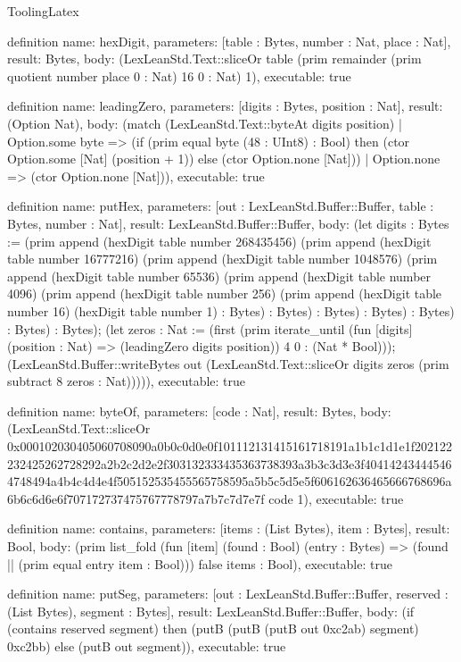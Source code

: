 \begin{lexlean}{ToolingLatex}
\begin{semanticmodule}
definition{
  name: hexDigit,
  parameters: [table : Bytes, number : Nat, place : Nat],
  result: Bytes,
  body: (LexLeanStd.Text::sliceOr table (prim remainder (prim quotient number place 0 : Nat) 16 0 : Nat) 1),
  executable: true
}

definition{
  name: leadingZero,
  parameters: [digits : Bytes, position : Nat],
  result: (Option Nat),
  body: (match (LexLeanStd.Text::byteAt digits position)
    | Option.some byte => (if (prim equal byte (48 : UInt8) : Bool) then (ctor Option.some [Nat] (position + 1)) else (ctor Option.none [Nat]))
    | Option.none => (ctor Option.none [Nat])),
  executable: true
}

definition{
  name: putHex,
  parameters: [out : LexLeanStd.Buffer::Buffer, table : Bytes, number : Nat],
  result: LexLeanStd.Buffer::Buffer,
  body: (let digits : Bytes := (prim append (hexDigit table number 268435456) (prim append (hexDigit table number 16777216) (prim append (hexDigit table number 1048576) (prim append (hexDigit table number 65536) (prim append (hexDigit table number 4096) (prim append (hexDigit table number 256) (prim append (hexDigit table number 16) (hexDigit table number 1) : Bytes) : Bytes) : Bytes) : Bytes) : Bytes) : Bytes) : Bytes); (let zeros : Nat := (first (prim iterate_until (fun [digits] (position : Nat) => (leadingZero digits position)) 4 0 : (Nat * Bool))); (LexLeanStd.Buffer::writeBytes out (LexLeanStd.Text::sliceOr digits zeros (prim subtract 8 zeros : Nat))))),
  executable: true
}

definition{
  name: byteOf,
  parameters: [code : Nat],
  result: Bytes,
  body: (LexLeanStd.Text::sliceOr 0x000102030405060708090a0b0c0d0e0f101112131415161718191a1b1c1d1e1f202122232425262728292a2b2c2d2e2f303132333435363738393a3b3c3d3e3f404142434445464748494a4b4c4d4e4f505152535455565758595a5b5c5d5e5f606162636465666768696a6b6c6d6e6f707172737475767778797a7b7c7d7e7f code 1),
  executable: true
}

definition{
  name: contains,
  parameters: [items : (List Bytes), item : Bytes],
  result: Bool,
  body: (prim list_fold (fun [item] (found : Bool) (entry : Bytes) => (found || (prim equal entry item : Bool))) false items : Bool),
  executable: true
}

definition{
  name: putSeg,
  parameters: [out : LexLeanStd.Buffer::Buffer, reserved : (List Bytes), segment : Bytes],
  result: LexLeanStd.Buffer::Buffer,
  body: (if (contains reserved segment) then (putB (putB (putB out 0xc2ab) segment) 0xc2bb) else (putB out segment)),
  executable: true
}


\end{semanticmodule}
\end{lexlean}
